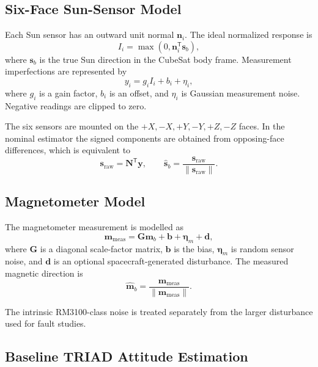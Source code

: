 \documentclass[11pt,a4paper]{article}
\begin{document}
\subsection{Six-Face Sun-Sensor Model}

Each Sun sensor has an outward unit normal $\mathbf{n}_i$. The ideal normalized response is
\begin{equation}
    I_i = \max\left(0,\mathbf{n}_i^\mathsf{T}\mathbf{s}_b\right),
\end{equation}
where $\mathbf{s}_b$ is the true Sun direction in the CubeSat body frame. Measurement imperfections are represented by
\begin{equation}
    y_i = g_i I_i+b_i+\eta_i,
\end{equation}
where $g_i$ is a gain factor, $b_i$ is an offset, and $\eta_i$ is Gaussian measurement noise. Negative readings are clipped to zero.

The six sensors are mounted on the $+X,-X,+Y,-Y,+Z,-Z$ faces. In the nominal estimator the signed components are obtained from opposing-face differences, which is equivalent to
\begin{equation}
    \mathbf{s}_{\mathrm{raw}}=\mathbf{N}^{\mathsf T}\mathbf{y},
    \qquad
    \hat{\mathbf{s}}_b=
    \frac{\mathbf{s}_{\mathrm{raw}}}{\|\mathbf{s}_{\mathrm{raw}}\|}.
\end{equation}

\subsection{Magnetometer Model}

The magnetometer measurement is modelled as
\begin{equation}
    \mathbf{m}_{\mathrm{meas}}
    =
    \mathbf{G}\mathbf{m}_b+
    \mathbf{b}+
    \boldsymbol{\eta}_m+
    \mathbf{d},
\end{equation}
where $\mathbf{G}$ is a diagonal scale-factor matrix, $\mathbf{b}$ is the bias, $\boldsymbol{\eta}_m$ is random sensor noise, and $\mathbf{d}$ is an optional spacecraft-generated disturbance. The measured magnetic direction is
\begin{equation}
    \hat{\mathbf{m}}_b=
    \frac{\mathbf{m}_{\mathrm{meas}}}
    {\|\mathbf{m}_{\mathrm{meas}}\|}.
\end{equation}

The intrinsic RM3100-class noise is treated separately from the larger disturbance used for fault studies.

\subsection{Baseline TRIAD Attitude Estimation}
\end{document}
